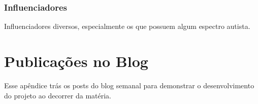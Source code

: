 \begin{apendicesenv}
	\subsection{Influenciadores}
	Influenciadores diversos, especialmente os que possuem algum espectro autista. 
	
	
	
	\chapter{Publicações no Blog}
	
	Esse apêndice trás os posts do blog semanal para demonstrar o desenvolvimento do projeto ao decorrer da matéria. 
	
	
	
	
\end{apendicesenv}
